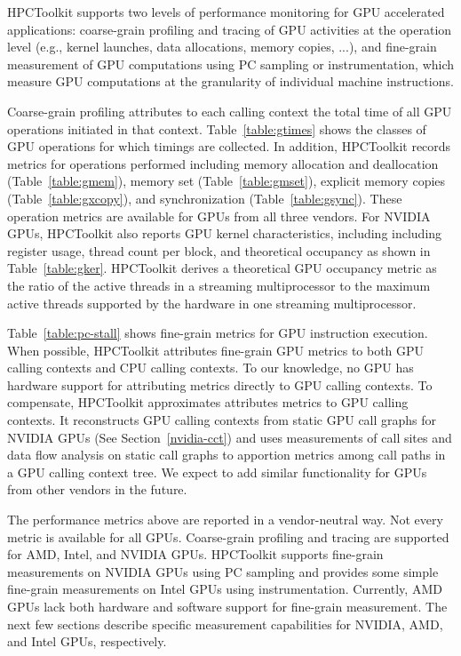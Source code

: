 HPCToolkit supports two levels of performance monitoring for GPU accelerated applications: coarse-grain profiling and tracing of GPU activities at the operation level (e.g., kernel launches, data allocations, memory copies, ...), and fine-grain measurement of GPU computations using PC sampling or instrumentation, which measure GPU computations at the granularity of individual machine instructions.

Coarse-grain profiling attributes to each calling context the total time of all GPU operations initiated in that context. Table~\ref{table:gtimes} shows the classes of GPU operations for which timings are collected. In addition, HPCToolkit records metrics for operations performed including memory allocation and deallocation (Table~\ref{table:gmem}), memory set (Table~\ref{table:gmset}), explicit memory copies (Table~\ref{table:gxcopy}), and synchronization (Table~\ref{table:gsync}). These operation metrics are available for GPUs from all three vendors.
For NVIDIA GPUs, HPCToolkit also reports GPU kernel characteristics, including including register usage, thread count per block, and theoretical occupancy as shown in Table~\ref{table:gker}. HPCToolkit derives a theoretical GPU occupancy metric as the ratio of the active threads in a streaming multiprocessor to the maximum active threads supported by the hardware in one streaming multiprocessor.

Table~\ref{table:pc-stall} shows fine-grain metrics for GPU instruction execution.
When possible, HPCToolkit attributes fine-grain GPU metrics to both GPU calling contexts and CPU calling contexts.
To our knowledge, no GPU has hardware support for attributing metrics directly to GPU calling contexts.
To compensate, HPCToolkit approximates attributes metrics to GPU calling contexts. It reconstructs GPU calling contexts from static GPU call graphs for
NVIDIA GPUs (See Section~\ref{nvidia-cct}) and uses measurements of call sites and data flow analysis on static call graphs to apportion metrics among call paths in a GPU calling context tree.
We expect to add similar functionality for GPUs from other vendors in the future.

The performance metrics above are reported in a vendor-neutral way. Not every metric is available for all GPUs.
Coarse-grain profiling and tracing are supported for AMD, Intel, and NVIDIA GPUs. HPCToolkit supports fine-grain measurements on NVIDIA GPUs using PC sampling and provides some simple fine-grain measurements on Intel GPUs using instrumentation.
Currently, AMD GPUs lack both hardware and software support for fine-grain measurement.  The next few sections describe specific measurement capabilities for NVIDIA, AMD, and Intel GPUs, respectively.


